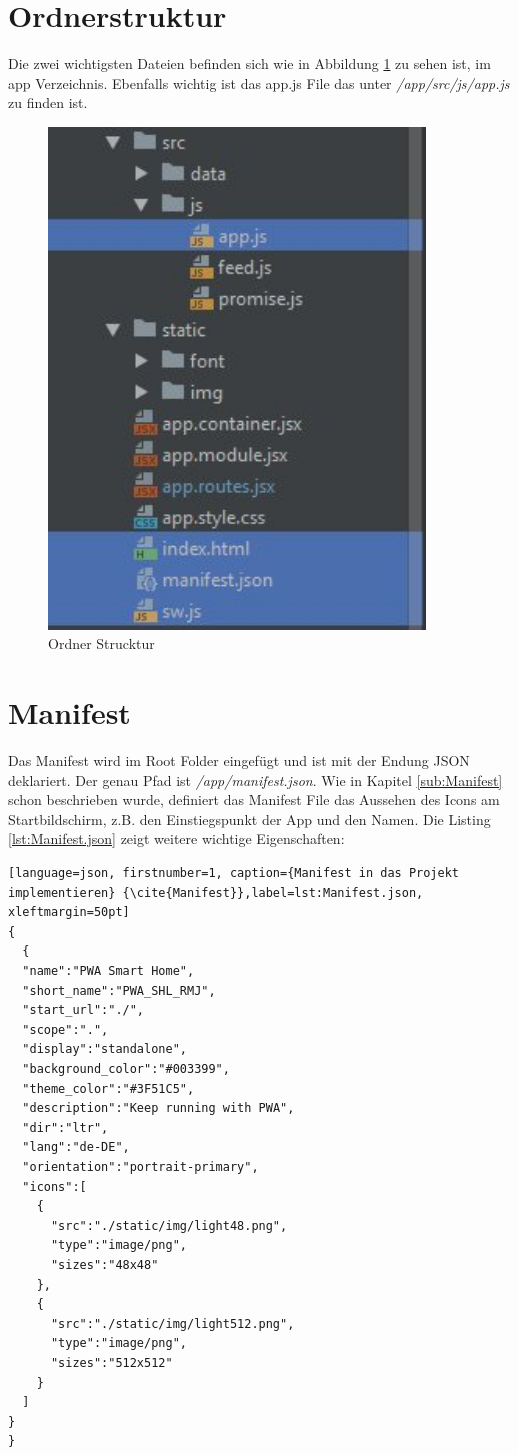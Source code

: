 \section{Ordnerstruktur}
Die zwei wichtigsten Dateien befinden sich wie in Abbildung \ref{fig:OrdnerStrucktur} zu sehen ist, im app Verzeichnis.
Ebenfalls wichtig ist das app.js File das unter \textit{/app/src/js/app.js} zu finden ist.

\begin{figure}[h]
	\centering
	\includegraphics[width=10cm]{BilderAllgemein/Implementierung/OrdnerStrucktur.jpg}\medskip
	\caption{Ordner Strucktur}
	\label{fig:OrdnerStrucktur}
\end{figure} 


\section{Manifest}
Das Manifest wird im Root Folder eingefügt und ist mit der Endung \acs{JSON} deklariert. Der genau Pfad ist \textit{/app/manifest.json}. Wie in Kapitel \ref{sub:Manifest} schon beschrieben wurde, definiert das Manifest File das Aussehen des Icons am Startbildschirm, z.B. den Einstiegspunkt der App und den Namen. 
Die Listing \ref{lst:Manifest.json} zeigt weitere wichtige Eigenschaften:
\newpage
\begin{lstlisting}[language=json, firstnumber=1, caption={Manifest in das Projekt implementieren} {\cite{Manifest}},label=lst:Manifest.json, xleftmargin=50pt]
{
  {
  "name":"PWA Smart Home",
  "short_name":"PWA_SHL_RMJ",
  "start_url":"./",
  "scope":".",
  "display":"standalone",
  "background_color":"#003399",
  "theme_color":"#3F51C5",
  "description":"Keep running with PWA",
  "dir":"ltr",
  "lang":"de-DE",
  "orientation":"portrait-primary",
  "icons":[
    {
      "src":"./static/img/light48.png",
      "type":"image/png",
      "sizes":"48x48"
    },
    {
      "src":"./static/img/light512.png",
      "type":"image/png",
      "sizes":"512x512"
    }
  ]
}
}
\end{lstlisting}
\clearpage
